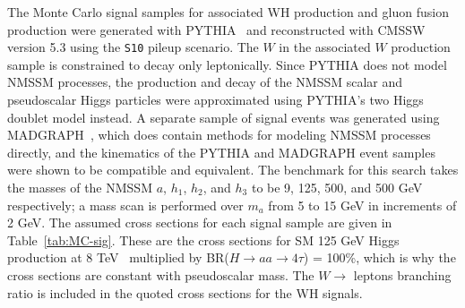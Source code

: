 The Monte Carlo signal samples for associated WH production and gluon fusion production were generated with PYTHIA~\cite{1126-6708-2006-05-026} and reconstructed with CMSSW version 5.3 using the \texttt{S10} pileup scenario. The $W$ in the associated $W$ production sample is constrained to decay only leptonically. Since PYTHIA does not model NMSSM processes, the production and decay of the NMSSM scalar and pseudoscalar Higgs particles were approximated using PYTHIA's two Higgs doublet model instead. A separate sample of signal events was generated using MADGRAPH~\cite{springerlink:10.1007/JHEP06(2011)128}, which does contain methods for modeling NMSSM processes directly, and the kinematics of the PYTHIA and MADGRAPH event samples were shown to be compatible and equivalent. The benchmark for this search takes the masses of the NMSSM $a$, $h_1$, $h_2$, and $h_3$ to be 9, 125, 500, and 500 GeV respectively; a mass scan is performed over $m_{a}$ from 5 to 15 GeV in increments of 2 GeV.  The assumed cross sections for each signal sample are given in Table~\ref{tab:MC-sig}.  These are the cross sections for SM 125 GeV Higgs production at 8 TeV~\cite{LHCHXSWG} multiplied by BR($H\rightarrow$$aa\rightarrow4\tau$) = 100\%, which is why the cross sections are constant with pseudoscalar mass.  The $W\rightarrow$ leptons branching ratio is included in the quoted cross sections for the WH signals.

